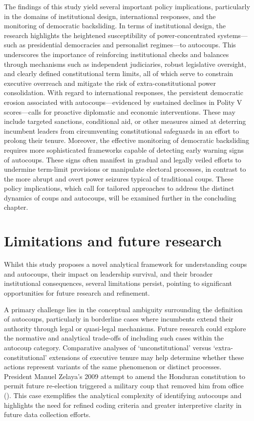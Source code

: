 \documentclass[
  12pt,
]{report}
\begin{document}
The findings of this study yield several important policy implications,
particularly in the domains of institutional design, international
responses, and the monitoring of democratic backsliding. In terms of
institutional design, the research highlights the heightened
susceptibility of power-concentrated systems---such as presidential
democracies and personalist regimes---to autocoups. This underscores the
importance of reinforcing institutional checks and balances through
mechanisms such as independent judiciaries, robust legislative
oversight, and clearly defined constitutional term limits, all of which
serve to constrain executive overreach and mitigate the risk of
extra-constitutional power consolidation. With regard to international
responses, the persistent democratic erosion associated with
autocoups---evidenced by sustained declines in Polity V scores---calls
for proactive diplomatic and economic interventions. These may include
targeted sanctions, conditional aid, or other measures aimed at
deterring incumbent leaders from circumventing constitutional safeguards
in an effort to prolong their tenure. Moreover, the effective monitoring
of democratic backsliding requires more sophisticated frameworks capable
of detecting early warning signs of autocoups. These signs often
manifest in gradual and legally veiled efforts to undermine term-limit
provisions or manipulate electoral processes, in contrast to the more
abrupt and overt power seizures typical of traditional coups. These
policy implications, which call for tailored approaches to address the
distinct dynamics of coups and autocoups, will be examined further in
the concluding chapter.

\section{Limitations and future
research}\label{limitations-and-future-research}

Whilst this study proposes a novel analytical framework for
understanding coups and autocoups, their impact on leadership survival,
and their broader institutional consequences, several limitations
persist, pointing to significant opportunities for future research and
refinement.

A primary challenge lies in the conceptual ambiguity surrounding the
definition of autocoups, particularly in borderline cases where
incumbents extend their authority through legal or quasi-legal
mechanisms. Future research could explore the normative and analytical
trade-offs of including such cases within the autocoup category.
Comparative analyses of `unconstitutional' versus `extra-constitutional'
extensions of executive tenure may help determine whether these actions
represent variants of the same phenomenon or distinct processes.
President Manuel Zelaya's 2009 attempt to amend the Honduran
constitution to permit future re-election triggered a military coup that
removed him from office
(). This case exemplifies the analytical complexity of identifying
autocoups and highlights the need for refined coding criteria and
greater interpretive clarity in future data collection efforts.
\end{document}
